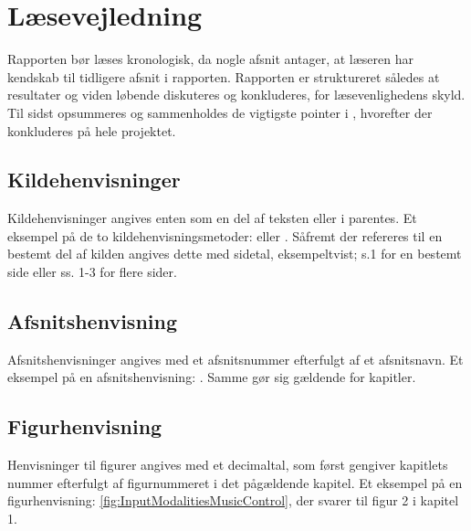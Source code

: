 \section*{Læsevejledning}
\label{Laesevejledning}
Rapporten bør læses kronologisk, da nogle afsnit antager, at læseren har kendskab til tidligere afsnit i rapporten.\blankline
%
Rapporten er struktureret således at resultater og viden løbende diskuteres og konkluderes, for læsevenlighedens skyld. Til sidst opsummeres og sammenholdes de vigtigste pointer i , hvorefter der konkluderes på hele projektet.
%
\subsection*{Kildehenvisninger}
Kildehenvisninger angives enten som en del af teksten eller i parentes. Et eksempel på de to kildehenvisningsmetoder: \textcite[s. 3]{PDF:PIIntroduction} eller \parencite[s. 1]{PDF:PIIntroduction}. Såfremt der refereres til en bestemt del af kilden angives dette med sidetal, eksempeltvist; s.1 for en bestemt side eller ss. 1-3 for flere sider.
%
\subsection*{Afsnitshenvisning}
Afsnitshenvisninger angives med et afsnitsnummer efterfulgt af et afsnitsnavn. Et eksempel på en afsnitshenvisning: . Samme gør sig gældende for kapitler.
%
\subsection*{Figurhenvisning}
Henvisninger til figurer angives med et decimaltal, som først gengiver kapitlets nummer efterfulgt af figurnummeret i det pågældende kapitel. Et eksempel på en figurhenvisning: \autoref{fig:InputModalitiesMusicControl}, der svarer til figur 2 i kapitel 1. 
%
